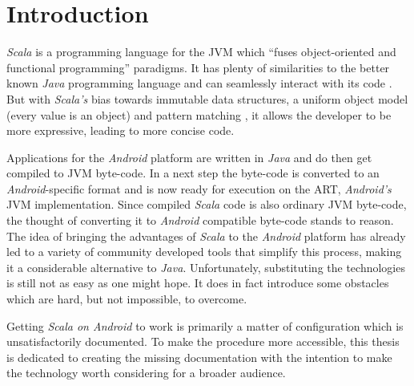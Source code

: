\section{Introduction}

\textit{Scala} is a programming language for the \acf{JVM} which \enquote{fuses object-oriented and functional programming} \cite[p. 1]{odersky04} paradigms. It has plenty of similarities to the better known \textit{Java} programming language and can seamlessly interact with its code \cite[p. 2]{odersky04}. But with \textit{Scala's} bias towards immutable data structures, a uniform object model (every value is an object) \cite[p. 3]{odersky04} and pattern matching \cite[p. 13]{odersky04}, it allows the developer to be more expressive, leading to more concise code.

Applications for the \textit{Android} platform are written in \textit{Java} and do then get compiled to \ac{JVM} byte-code. In a next step the byte-code is converted to an \textit{Android}-specific format and is now ready for execution on the \acf{ART}, \textit{Android's} \ac{JVM} implementation. Since compiled \textit{Scala} code is also ordinary \ac{JVM} byte-code, the thought of converting it to \textit{Android} compatible byte-code stands to reason. The idea of bringing the advantages of \textit{Scala} to the \textit{Android} platform has already led to a variety of community developed tools that simplify this process, making it a considerable alternative to \textit{Java}. Unfortunately, substituting the technologies is still not as easy as one might hope. It does in fact introduce some obstacles which are hard, but not impossible, to overcome.

Getting \textit{Scala on Android} to work is primarily a matter of configuration which is unsatisfactorily documented. To make the procedure more accessible, this thesis is dedicated to creating the missing documentation with the intention to make the technology worth considering for a broader audience.